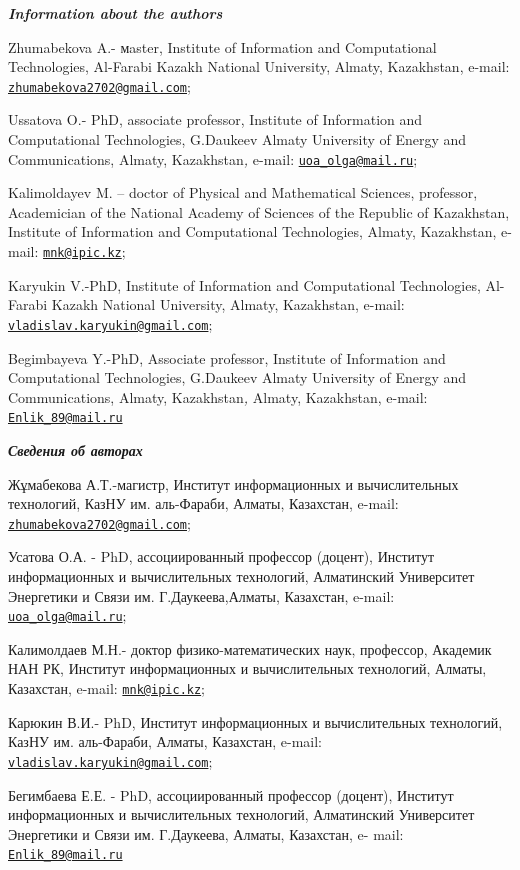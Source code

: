 \emph{{\bfseries Information about the authors}}

Zhumabekova A.- мaster, Institute of Information and Computational
Technologies, Al-Farabi Kazakh National University, Almaty, Kazakhstan,
e-mail:
\href{mailto:zhumabekova2702@gmail.com}{\nolinkurl{zhumabekova2702@gmail.com}};

Ussatova O.- PhD, associate professor, Institute of Information and
Computational Technologies, G.Daukeev Almaty University of Energy and
Communications, Almaty, Kazakhstan\emph{,} e-mail:
\href{mailto:uoa_olga@mail.ru}{\nolinkurl{uoa\_olga@mail.ru}};

Kalimoldayev M. -- doctor of Physical and Mathematical Sciences,
professor, Academician of the National Academy of Sciences of the
Republic of Kazakhstan, Institute of Information and Computational
Technologies, Almaty, Kazakhstan, e-mail:
\href{mailto:mnk@ipic.kz}{\nolinkurl{mnk@ipic.kz}};

Karyukin V.-PhD, Institute of Information and Computational
Technologies, Al-Farabi Kazakh National University, Almaty, Kazakhstan,
e-mail:
\href{mailto:vladislav.karyukin@gmail.com}{\nolinkurl{vladislav.karyukin@gmail.com}};

Begimbayeva Y.-PhD, Associate professor, Institute of Information and
Computational Technologies, G.Daukeev Almaty University of Energy and
Communications, Almaty, Kazakhstan\emph{,} Almaty, Kazakhstan, e-mail:
\href{mailto:Enlik_89@mail.ru}{\nolinkurl{Enlik\_89@mail.ru}}

\emph{{\bfseries Сведения об авторах}}

Жұмабекова А.Т.-магистр, Институт информационных и вычислительных
технологий, КазНУ им. аль-Фараби, Алматы, Казахстан, e-mail:
\href{mailto:zhumabekova2702@gmail.com}{\nolinkurl{zhumabekova2702@gmail.com}};

Усатова О.А. - PhD, ассоциированный профессор (доцент), Институт
информационных и вычислительных технологий, Алматинский Университет
Энергетики и Связи им. Г.Даукеева,Алматы, Казахстан, e-mail:
\href{mailto:uoa_olga@mail.ru}{\nolinkurl{uoa\_olga@mail.ru}};

Калимолдаев М.Н.- доктор физико-математических наук, профессор, Академик
НАН РК, Институт информационных и вычислительных технологий, Алматы,
Казахстан, e-mail: \href{mailto:mnk@ipic.kz}{\nolinkurl{mnk@ipic.kz}};

Карюкин В.И.- PhD, Институт информационных и вычислительных технологий,
КазНУ им. аль-Фараби, Алматы, Казахстан, e-mail:
\href{mailto:vladislav.karyukin@gmail.com}{\nolinkurl{vladislav.karyukin@gmail.com}};

Бегимбаева Е.Е. - PhD, ассоциированный профессор (доцент), Институт
информационных и вычислительных технологий, Алматинский Университет
Энергетики и Связи им. Г.Даукеева, Алматы, Казахстан, e- mail:
\href{mailto:Enlik_89@mail.ru}{\nolinkurl{Enlik\_89@mail.ru}}

